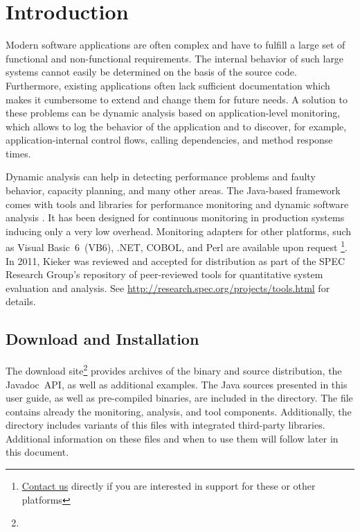 \chapter{Introduction}\label{chp:Introduction}

	Modern software applications are often complex and have to fulfill a large set of functional and non-functional requirements. The internal behavior of such large systems cannot easily be determined on the basis of the source code. Furthermore, existing applications often lack sufficient documentation which makes it cumbersome to extend and change them for future needs. A solution to these problems can be dynamic analysis based on application-level monitoring, which allows to log the behavior of the application and to discover, for example, application-internal control flows, calling dependencies, and method response times.

	Dynamic analysis can help in detecting performance problems and faulty behavior, capacity planning, and many other areas. The Java-based \Kieker{} framework comes with tools and libraries for performance monitoring and dynamic software analysis \cite{KiekerICPE2012}. It has been designed for continuous monitoring in production systems inducing only a very low overhead. Monitoring adapters for other platforms, such as Visual Basic~6~(VB6), .NET, COBOL, and Perl are available upon request \footnote{\href{http://kieker-monitoring.net/support/}{Contact us} directly if you are interested in \Kieker{} support for these or other platforms}.  \\
	
	\noindent
	In 2011, Kieker was reviewed and accepted for distribution as part of the SPEC Research Group's repository of peer-reviewed tools for quantitative system evaluation and analysis. See \url{http://research.spec.org/projects/tools.html} for details.\\

	
	\section{Download and Installation}
		
		The \Kieker{} download site\footnote{\KiekerDownloadURL{}} provides archives of the binary and source distribution, the Javadoc~API, as well as additional examples. The Java sources presented in this user guide, as well as pre-compiled binaries, are included in the \file{\exampleDir/} directory. The file \file{\mainJar{}} contains already the monitoring, analysis, and tool components. Additionally, the  directory includes variants of this  files with integrated third-party libraries. Additional information on these  files and when to use them will follow later in this document.
		
